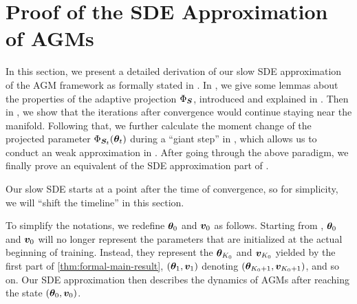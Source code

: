 \section{Proof of the SDE Approximation of AGMs}\label{sec:proof-sde-approx}
In this section, we present a detailed derivation of our slow SDE approximation of the AGM framework as formally stated in . In , we give some lemmas about the properties of the adaptive projection $\Phi_{{\bm{S}}}$, introduced and explained in . Then in , we show that the iterations after convergence would continue staying near the manifold. Following that, we further calculate the moment change of the projected parameter $\Phi_{{\bm{S}}_t}({\bm{\theta}}_t)$ during a ``giant step'' in , which allows us to conduct an weak approximation in . After going through the above paradigm, we finally prove an equivalent  of the SDE approximation part of .

Our slow SDE starts at a point after the time of convergence, so for simplicity, we will ``shift the timeline'' in this section.
\begin{remark}\label{rmk:time-shift-theta0-phi0}
    To simplify the notations, we redefine ${\bm{\theta}}_0$ and ${\bm{v}}_0$ as follows. Starting from , ${\bm{\theta}}_0$ and ${\bm{v}}_0$ will no longer represent the parameters that are initialized at the actual beginning of training. Instead, they represent the ${\bm{\theta}}_{K_0}$ and ${\bm{v}}_{K_0}$ yielded by the first part of \cref{thm:formal-main-result}, $({\bm{\theta}}_1,{\bm{v}}_1)$ denoting $({\bm{\theta}}_{K_0+1}, {\bm{v}}_{K_0+1})$, and so on. Our SDE approximation then describes the dynamics of AGMs after reaching the state $({\bm{\theta}}_0,{\bm{v}}_0)$.
\end{remark}

